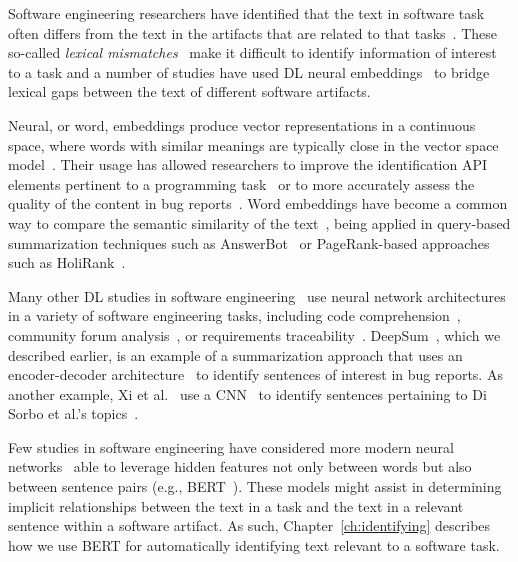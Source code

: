 Software engineering researchers have identified that the text 
in software task 
often differs from the text in the artifacts that are related to that tasks~\cite{Huang2018}. 
These so-called \textit{lexical mismatches}~\cite{Ye2016} 
 make it difficult to identify information of interest 
to a task and a number of studies have used \acs{DL}
neural embeddings~\cite{Mikolov2013} to bridge lexical gaps between the text of different software artifacts. 


Neural, or word, embeddings produce vector representations in a continuous space,
where words with similar meanings are typically close in the vector space model~\cite{harris1954distributional, mikolov2013efficient}. 
Their usage has allowed researchers to improve 
the identification API elements pertinent to a programming task~\cite{Ye2016} 
or to more accurately assess the quality of the content in bug reports~\cite{chaparro2019}.
Word embeddings have become a common way 
to compare the semantic similarity of the text~\cite{mihalcea2006},
being applied in query-based summarization techniques such as 
AnswerBot~\cite{Xu2017}
or PageRank-based approaches such as HoliRank~\cite{Ponzanelli2017}.



Many other \acs{DL} studies in software engineering~\cite{ferreira2021,li2018deep, watson2022}
use neural network architectures 
in a variety of software engineering tasks, including
code comprehension~\cite{allamanis2015, mi2018}, community forum analysis~\cite{Lin2018, wang2019}, or requirements traceability~\cite{chen2019, guo2017}.
DeepSum~\cite{Li2018}, which we described earlier, is an example of a 
summarization approach that uses an encoder-decoder architecture~\cite{cho2014-encoder-decoder}  to identify 
sentences of interest in bug reports. As another example,
Xi et al.~\cite{Xia2017} use a \ac{CNN}~\cite{krizhevsky2012CNN} 
to identify sentences pertaining to Di Sorbo et al.'s topics~\cite{Sorbo2015}.



Few studies in software engineering have considered more modern neural networks~\cite{watson2022}
able to leverage hidden features not only between words but also between sentence pairs (e.g., \acs{BERT}~\cite{Devlin2018Bert}). 
These models might assist in determining 
implicit relationships between the text in a task and the text in a relevant sentence within a software artifact.
As such, Chapter~\ref{ch:identifying} describes how we use \acs{BERT} for automatically 
identifying text relevant to a software task.
